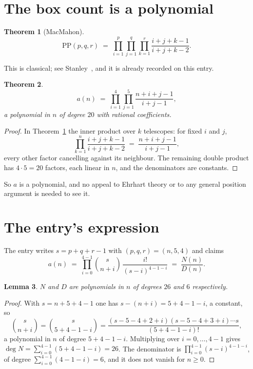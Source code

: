 \documentclass[11pt,a4paper]{article}
\theoremstyle{plain}
\newtheorem{theorem}{Theorem}
\newtheorem{lemma}[theorem]{Lemma}
\theoremstyle{definition}
\begin{document}
\section{The box count is a polynomial}

\begin{theorem}[MacMahon]\label{thm:mm}
\[
\mathrm{PP}(p,q,r)\;=\;\prod_{i=1}^{p}\prod_{j=1}^{q}\prod_{k=1}^{r}
\frac{i+j+k-1}{i+j+k-2} .
\]
\end{theorem}

This is classical; see Stanley~\cite{stanley}, and it is already recorded on this entry.

\begin{theorem}\label{thm:poly}
\[
a(n)\;=\;\prod_{i=1}^{4}\prod_{j=1}^{5}\frac{n+i+j-1}{i+j-1},
\]
a polynomial in $n$ of degree $20$ with rational coefficients.
\end{theorem}

\begin{proof}
In Theorem~\ref{thm:mm} the inner product over $k$ telescopes: for fixed $i$ and $j$,
\[
\prod_{k=1}^{n}\frac{i+j+k-1}{i+j+k-2}\;=\;\frac{n+i+j-1}{i+j-1} ,
\]
every other factor cancelling against its neighbour. The remaining double product has
$4\cdot5=20$ factors, each linear in $n$, and the denominators are constants.
\end{proof}

So $a$ is a polynomial, and no appeal to Ehrhart theory or to any general position argument is
needed to see it.

\section{The entry's expression}

The entry writes $s=p+q+r-1$ with $(p,q,r)=(n,5,4)$ and claims
\[
a(n)\;=\;\prod_{i=0}^{4-1}\binom{s}{n+i}\,\frac{i!}{(s-i)^{4-1-i}}\;=\;
\frac{N(n)}{D(n)} .
\]

\begin{lemma}\label{lem:deg}
$N$ and $D$ are polynomials in $n$ of degrees $26$ and $6$ respectively.
\end{lemma}

\begin{proof}
With $s=n+5+4-1$ one has $s-(n+i)=5+4-1-i$, a constant, so
\[
\binom{s}{n+i}=\binom{s}{5+4-1-i}
=\frac{(s-5-4+2+i)(s-5-4+3+i)\cdots s}{(5+4-1-i)!},
\]
a polynomial in $n$ of degree $5+4-1-i$. Multiplying over $i=0,\dots,4-1$ gives
$\deg N=\sum_{i=0}^{4-1}(5+4-1-i)=26$. The denominator is
$\prod_{i=0}^{4-1}(s-i)^{4-1-i}$, of degree
$\sum_{i=0}^{4-1}(4-1-i)=6$, and it does not vanish for $n\ge0$.
\end{proof}
\end{document}
